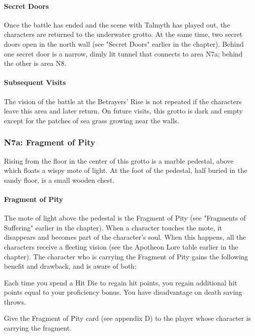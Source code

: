 \documentclass[10pt,a4,twoside,twocolumn,openany,nodeprecatedcode]{dndbook}
\begin{document}
\paragraph{Secret Doors}
Once the battle has ended and the scene with Talmyth has played out, the characters are returned to the underwater grotto. At the same time, two secret doors open in the north wall (see "Secret Doors" earlier in the chapter). Behind one secret door is a narrow, dimly lit tunnel that connects to area N7a; behind the other is area N8.
\paragraph{Subsequent Visits}
The vision of the battle at the Betrayers' Rise is not repeated if the characters leave this area and later return. On future visits, this grotto is dark and empty except for the patches of sea grass growing near the walls.
\subsubsection{N7a: Fragment of Pity}
\begin{DndReadAloud}{}
Rising from the floor in the center of this grotto is a marble pedestal, above which floats a wispy mote of light. At the foot of the pedestal, half buried in the sandy floor, is a small wooden chest.
\end{DndReadAloud}

\paragraph{Fragment of Pity}
The mote of light above the pedestal is the Fragment of Pity (see "Fragments of Suffering" earlier in the chapter). When a character touches the mote, it disappears and becomes part of the character's soul. When this happens, all the characters receive a fleeting vision (see the Apotheon Lore table earlier in the chapter).
The character who is carrying the Fragment of Pity gains the following benefit and drawback, and is aware of both:
\begin{DndComment}{}
{{Each time you spend a Hit Die to regain hit points, you regain additional hit points equal to your proficiency bonus.}}
{{You have disadvantage on death saving throws.}}
\end{DndComment}

Give the Fragment of Pity card (see appendix D) to the player whose character is carrying the fragment.
\end{document}
